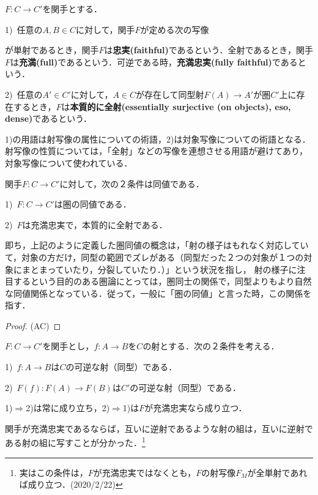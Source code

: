 \documentclass[uplatex, 12pt, dvipdfmx]{jsreport}
\begin{document}
\begin{shadebox}\begin{definition}[忠実，充満関手]\rm{}
    $F:C\to C'$を関手とする．

    1)\, 任意の$A,B\in C$に対して，関手$F$が定める次の写像
    \begin{center}\end{center}
    が単射であるとき，関手$F$は\textbf{忠実(faithful)}であるという．全射であるとき，関手$F$は\textbf{充満(full)}であるという．可逆である時，\textbf{充満忠実(fully faithful)}であるという．

    2)\, 任意の$A'\in C'$に対して，$A\in C$が存在して同型射$F(A)\to A'$が圏$C'$上に存在するとき，$F$は\textbf{本質的に全射(essentially surjective (on objects), eso, dense)}であるという．
\end{definition}\end{shadebox}
1)の用語は射写像の属性についての術語，2)は対象写像についての術語となる．射写像の性質については，「全射」などの写像を連想させる用語が避けてあり，対象写像について使われている．

\begin{proposition}[圏の同値の特徴付け]\label{prop-charactorization of equavalence of categories}
    関手$F:C\to C'$に対して，次の２条件は同値である．\rm{}

    1)\, $F:C\to C'$は圏の同値である．

    2)\, $F$は充満忠実で，本質的に全射である．
\end{proposition}
即ち，上記のように定義した圏同値の概念は，「射の様子はもれなく対応していて，対象の方だけ，同型の範囲でズレがある（同型だった２つの対象が１つの対象にまとまっていたり，分裂していたり．）」という状況を指し，
射の様子に注目するという目的のある圏論にとっては，圏同士の関係で，同型よりもより自然な同値関係となっている．従って，一般に「圏の同値」と言った時，この関係を指す．
\begin{proof}{(AC)}
    
\end{proof}

\begin{lemma}
    $F:C\to C'$を関手とし，$f:A\to B$を$C$の射とする．次の２条件を考える．\rm{}

    1)\, $f:A\to B$は$C$の可逆な射（同型）である．

    2)\, $F(f):F(A)\to F(B)$は$C'$の可逆な射（同型）である．

    1)$\Rightarrow$2)は常に成り立ち，2)$\Rightarrow$1)は$F$が充満忠実なら成り立つ．
\end{lemma}
関手が充満忠実であるならば，互いに逆射であるような射の組は，互いに逆射である射の組に写すことが分かった．\footnote{実はこの条件は，$F$が充満忠実ではなくとも，$F$の射写像$F_M$が全単射であれば成り立つ．(2020/2/22)}
\end{document}
